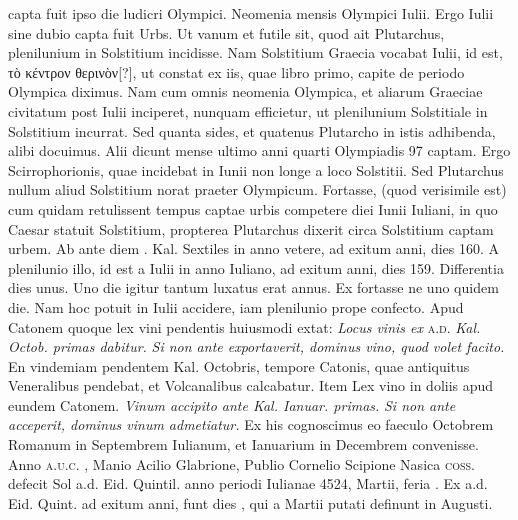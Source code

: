 capta fuit ipso die ludicri Olympici.
Neomenia mensis Olympici
 Iulii.
Ergo  Iulii sine dubio capta fuit Urbs.
Ut vanum et
futile sit, quod ait Plutarchus, plenilunium in Solstitium incidisse.
Nam Solstitium Graecia vocabat  Iulii, id est, 
 \textgreek{τὸ κέντρον θερινὸν[?]},
ut constat ex iis, quae libro primo, capite de periodo Olympica diximus.
Nam cum omnis neomenia Olympica, et aliarum Graeciae
civitatum post  Iulii inciperet, nunquam efficietur, ut plenilunium
Solstitiale in Solstitium incurrat.
Sed quanta sides, et quatenus
Plutarcho in istis adhibenda, alibi docuimus.
Alii dicunt mense
ultimo anni quarti Olympiadis 97 captam.
Ergo  Scirrophorionis,
quae incidebat in  Iunii non longe a loco Solstitii.
Sed
Plutarchus nullum aliud Solstitium norat praeter Olympicum.
Fortasse, (quod verisimile est) cum quidam retulissent tempus captae
urbis competere diei  Iunii Iuliani, in quo Caesar statuit Solstitium,
propterea Plutarchus dixerit circa Solstitium captam urbem.
Ab ante diem . Kal. Sextiles in anno vetere,
 ad exitum anni, dies
160.
%
A plenilunio illo, id est a  Iulii
 in anno Iuliano, ad exitum
anni, dies 159.
Differentia dies unus.
Uno die igitur tantum
luxatus erat annus.
Ex fortasse ne uno quidem die.
Nam hoc potuit
in  Iulii accidere, iam plenilunio prope confecto.
Apud Catonem
quoque lex vini pendentis huiusmodi extat: \textit{Locus vinis ex}
\textsc{a.d.} \textit{Kal. Octob. primas dabitur.} %
\textit{Si non ante exportaverit, dominus
vino, quod volet facito.}
En vindemiam pendentem Kal. Octobris,
tempore Catonis, quae antiquitus Veneralibus pendebat, et Volcanalibus
calcabatur.
Item Lex vino in doliis apud eundem Catonem.
\textit{Vinum accipito ante Kal. Ianuar. primas.} %
\textit{Si non ante acceperit, dominus
vinum admetiatur.}
Ex his cognoscimus eo faeculo Octobrem
Romanum in Septembrem Iulianum, et Ianuarium in Decembrem
convenisse.
Anno \textsc{a.u.c.} , Manio Acilio Glabrione,
 Publio Cornelio
Scipione Nasica \textsc{coss.} defecit Sol a.d.  Eid. Quintil. %
 anno periodi
Iulianae 4524,  Martii, feria .
Ex a.d. Eid. Quint. ad
 exitum anni,
funt dies , qui a  Martii putati definunt
 in  Augusti.
